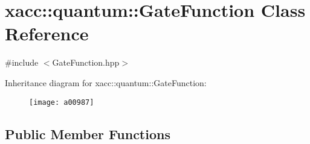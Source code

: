 \hypertarget{a00987}{}\section{xacc\+:\+:quantum\+:\+:Gate\+Function Class Reference}
\label{a00987}


{\ttfamily \#include $<$Gate\+Function.\+hpp$>$}

Inheritance diagram for xacc\+:\+:quantum\+:\+:Gate\+Function\+:\begin{figure}[H]
\begin{center}
\leavevmode
\texttt{[image: a00987]}
\end{center}
\end{figure}
\subsection*{Public Member Functions}
